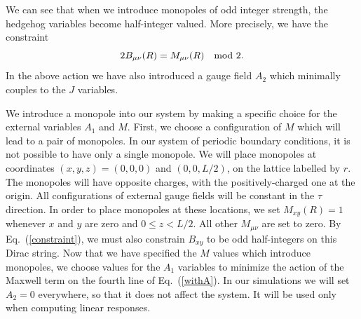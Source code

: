 \documentclass[prb,twocolumn]{revtex4-1}
\begin{document}
We can see that when we introduce monopoles of odd integer strength, the hedgehog variables become half-integer valued. More precisely, we have the constraint
\begin{equation}
2B_{\mu\nu}(R)=M_{\mu\nu}(R) ~~~{\rm mod}~2. 
\label{constraint}
\end{equation}
In the above action we have also introduced a gauge field $A_2$ which minimally couples to the $J$ variables.

We introduce a monopole into our system by making a specific choice for the external variables $A_1$ and $M$. First, we choose a configuration of $M$ which will lead to a pair of monopoles. In our system of periodic boundary conditions, it is not possible to have only a single monopole. We will place monopoles at coordinates $(x,y,z)=(0,0,0)$ and $(0,0,L/2)$, on the lattice labelled by $r$. The monopoles will have opposite charges, with the positively-charged one at the origin. All configurations of external gauge fields will be constant in the $\tau$ direction. In order to place monopoles at these locations, we set $M_{xy}(R)=1$ whenever $x$ and $y$ are zero and $0\leq z<L/2$. All other $M_{\mu\nu}$ are set to zero. By Eq.~(\ref{constraint}), we must also constrain $B_{xy}$ to be odd half-integers on this Dirac string. Now that we have specified the $M$ values which introduce monopoles, we choose values for the $A_1$ variables to minimize the action of the Maxwell term on the fourth line of Eq.~(\ref{withA}). In our simulations we will set $A_2=0$ everywhere, so that it does not affect the system. It will be used only when computing linear responses. 
\end{document}
